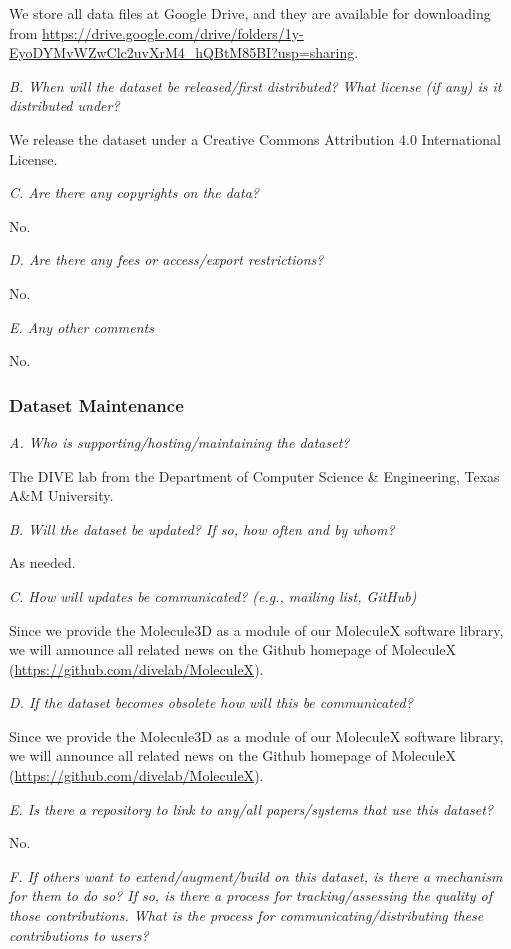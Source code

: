 \documentclass{article}
\begin{document}
We store all data files at Google Drive, and they are available for downloading from \url{https://drive.google.com/drive/folders/1y-EyoDYMvWZwClc2uvXrM4\_hQBtM85BI?usp=sharing}.

\textit{B. When will the dataset be released/first distributed? What license (if any) is it distributed under?}

We release the dataset under a Creative Commons Attribution 4.0 International License.

\textit{C. Are there any copyrights on the data?}

No.

\textit{D. Are there any fees or access/export restrictions?}

No.

\textit{E. Any other comments}

No.

\subsubsection{Dataset Maintenance}

\textit{A. Who is supporting/hosting/maintaining the dataset?}

The DIVE lab from the Department of Computer Science \& Engineering, Texas A\&M University.

\textit{B. Will the dataset be updated? If so, how often and by whom?}

As needed.

\textit{C. How will updates be communicated? (e.g., mailing list, GitHub)}

Since we provide the Molecule3D as a module of our MoleculeX software library, we will announce all related news on the Github homepage of MoleculeX (\url{https://github.com/divelab/MoleculeX}).

\textit{D. If the dataset becomes obsolete how will this be communicated?}

Since we provide the Molecule3D as a module of our MoleculeX software library, we will announce all related news on the Github homepage of MoleculeX (\url{https://github.com/divelab/MoleculeX}). 

\textit{E. Is there a repository to link to any/all papers/systems that use this dataset?}

No.

\textit{F. If others want to extend/augment/build on this dataset, is there a mechanism for them to do so? If so, is there a process for tracking/assessing the quality of those contributions. What is the process for communicating/distributing these contributions to users?}
\end{document}
